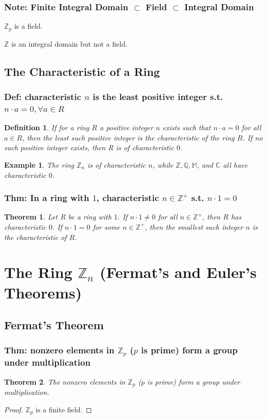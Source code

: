 \documentclass[11pt,a4paper]{article}
\newtheorem{theorem}{Theorem}
\newtheorem{example}{Example}
\newtheorem{definition}{Definition}
\begin{document}
\subsubsection{Note: Finite Integral Domain $\subset$ Field $\subset$ Integral Domain}
$\mathbb{Z}_p$ is a field.

$\mathbb{Z}$ is an integral domain but not a field.

\subsection{The Characteristic of a Ring}
\subsubsection{Def: characteristic $n$ is the least positive integer s.t. $n\cdot a=0,\forall a\in R$}
\begin{definition}
    If for a ring $R$ a positive integer $n$ exists such that $n \cdot a = 0$ for all $a\in R$, then the least such positive integer is the characteristic of the ring $R$. If no such positive integer exists, then R is of characteristic $0$.
\end{definition}
\begin{example}
    The ring $\mathbb{Z}_n$ is of characteristic $n$, while $\mathbb{Z}, \mathbb{Q}, \mathbb{M}$, and $\mathbb{C}$ all have characteristic $0$.
\end{example}

\subsubsection{Thm: In a ring with $1$, characteristic $n\in \mathbb{Z}^+$ s.t. $n\cdot 1=0$}
\begin{theorem}
    Let $R$ be a ring with $1$. If $n \cdot 1 \neq 0$ for all $n\in \mathbb{Z}^+$, then $R$ has characteristic $0$. If
    $n \cdot 1 = 0$ for some $n\in \mathbb{Z}^+$, then the smallest such integer $n$ is the characteristic of $R$.
\end{theorem}

\section{The Ring $\mathbb{Z}_n$ (Fermat's and Euler's Theorems)}
\subsection{Fermat's Theorem}
\subsubsection{Thm: nonzero elements in $\mathbb{Z}_p$ ($p$ is prime) form a group under multiplication}
\begin{theorem}
    The nonzero elements in $\mathbb{Z}_p$ ($p$ is prime) form a group under multiplication.
\end{theorem}
\begin{proof}
$\mathbb{Z}_p$ is a finite field.
\end{proof}
\end{document}
